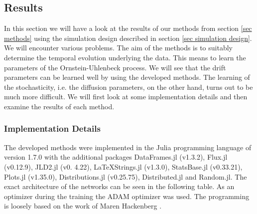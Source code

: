 \documentclass[11pt,titlepage]{article}
\theoremstyle{definition}
\theoremstyle{remark}
\begin{document}
	\clearpage
	
	\subsection{Results}
	
	In this section we will have a look at the results of our methods from section \ref{sec methods} using the simulation design described in section \ref{sec simulation design}. 
	We will encounter various problems. The aim of the methods is to suitably determine the temporal evolution underlying the data. This means to learn the parameters of the Ornstein-Uhlenbeck process. We will see that the drift parameters can be learned well by using the developed methods. The learning of the stochasticity, i.e. the diffusion parameters, on the other hand, turns out to be much more difficult. 
	We will first look at some implementation details and then examine the results of each method.
	
	\subsubsection{Implementation Details}
	
	The developed methods were implemented in the Julia programming language of version 1.7.0 with the additional packages DataFrames.jl (v1.3.2), Flux.jl (v0.12.9), JLD2.jl (v0. 4.22), LaTeXStrings.jl (v1.3.0), StatsBase.jl (v0.33.21), Plots.jl (v1.35.0), Distributions.jl (v0.25.75), Distributed.jl and Random.jl. The exact architecture of the networks can be seen in the following table. As an optimizer during the training the ADAM optimizer \cite{Kingma2014Adam} was used. The programming is loosely based on the work of Maren Hackenberg \cite{Hackenberg2022}.
\end{document}
